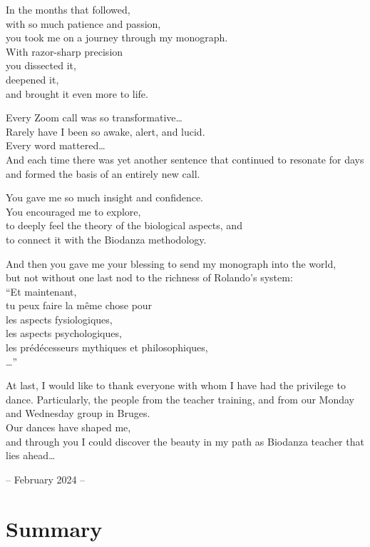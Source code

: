 \documentclass[
  11pt,
]{book}
\begin{document}
In the months that followed,\\
with so much patience and passion,\\
you took me on a journey through my monograph.\\
With razor-sharp precision\\
you dissected it,\\
deepened it,\\
and brought it even more to life.

Every Zoom call was so transformative\ldots{}\\
Rarely have I been so awake, alert, and lucid.\\
Every word mattered\ldots{}\\
And each time there was yet another sentence that continued to resonate for days and formed the basis of an entirely new call.

You gave me so much insight and confidence.\\
You encouraged me to explore,\\
to deeply feel the theory of the biological aspects, and\\
to connect it with the Biodanza methodology.

And then you gave me your blessing to send my monograph into the world,\\
but not without one last nod to the richness of Rolando's system:\\
``Et maintenant,\\
tu peux faire la même chose pour\\
les aspects fysiologiques,\\
les aspects psychologiques,\\
les prédécesseurs mythiques et philosophiques,\\
\ldots{}''

At last, I would like to thank everyone with whom I have had the privilege to dance.
Particularly, the people from the teacher training, and from our Monday and Wednesday group in Bruges.\\
Our dances have shaped me,\\
and through you I could discover the beauty in my path as Biodanza teacher that lies ahead\ldots{}

-- February 2024 --

\hypertarget{summary}{%
\chapter*{Summary}\label{summary}}
\end{document}
